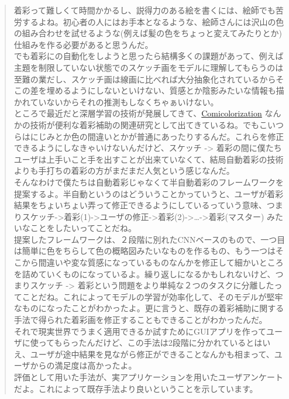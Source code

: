 \documentclass[a4paper, dvipdfmx, 10pt]{article}
\begin{document}
\begin{quote}
着彩って難しくて時間かかるし、説得力のある絵を書くには、絵師でも苦労するよね。初心者の人にはお手本となるような、絵師さんには沢山の色の組み合わせを試せるような(例えば髪の色をちょっと変えてみたりとか)仕組みを作る必要があると思うんだ。\\

でも着彩にの自動化をしようと思ったら結構多くの課題があって、例えば主題を制限していない状態でのスケッチ画をモデルに理解してもらうのは至難の業だし、スケッチ画は線画に比べれば大分抽象化されているからそこの差を埋めるようにしないといけない、質感とか陰影みたいな情報も描かれていないからそれの推測もしなくちゃぁいけない。\\

ところで最近だと深層学習の技術が発展してきて、\href{https://nico-opendata.jp/ja/casestudy/comicolorization/index.html}{Comicolorization} なんかの技術が便利な着彩補助の関連研究として出てきているね。でもこいつらはにじみとか色の間違いとかが普通にあったりするんだ。これらを修正できるようにしなきゃいけないんだけど、スケッチ -> 着彩の間に僕たちユーザは上手いこと手を出すことが出来ていなくて、結局自動着彩の技術よりも手打ちの着彩の方がまだまだ人気という感じなんだ。\\

そんなわけで僕たちは自動着彩じゃなくて半自動着彩のフレームワークを提案するよ。半自動というのはどういうことかっていうと、ユーザが着彩結果をちょいちょい弄って修正できるようにしているっていう意味、つまりスケッチ->着彩(1)->ユーザの修正->着彩(2)->\ldots{}->着彩(マスター) みたいなことをしたいってことだね。\\
提案したフレームワークは、２段階に別れたCNNベースのもので、一つ目は簡単に色をちらして色の概略図みたいなものを作るもの、もう一つはそこから間違いや変な質感になっているものなんかを修正して細かいところを詰めていくものになっているよ。繰り返しになるかもしれないけど、つまりスケッチ -> 着彩という問題をより単純な２つのタスクに分離したってことだね。これによってモデルの学習が効率化して、そのモデルが堅牢なものになったことがわかったよ。更に言うと、既存の着彩補助に関する手法で得られた着彩画を修正することもできることがわかったんだ。\\

それで現実世界でうまく適用できるか試すためにGUIアプリを作ってユーザに使ってもらったんだけど、この手法は2段階に分かれているとはいえ、ユーザが途中結果を見ながら修正ができることなんかも相まって、ユーザからの満足度は高かったよ。\\

評価として用いた手法が、実アプリケーションを用いたユーザアンケートだよ。これによって既存手法より良いということを示しています。\\


\end{quote}
\end{document}
